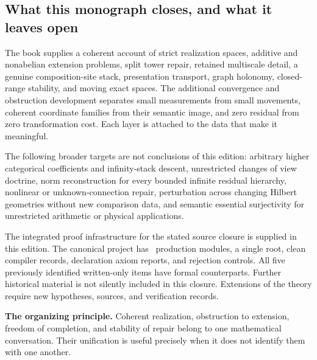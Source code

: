 \subsection{What this monograph closes, and what it leaves open}
The book supplies a coherent account of strict realization spaces, additive and nonabelian extension problems, split tower repair, retained multiscale detail, a genuine composition-site stack, presentation transport, graph holonomy, closed-range stability, and moving exact spaces. The additional convergence and obstruction development separates small measurements from small movements, coherent coordinate families from their semantic image, and zero residual from zero transformation cost. Each layer is attached to the data that make it meaningful.

The following broader targets are not conclusions of this edition: arbitrary higher categorical coefficients and infinity-stack descent, unrestricted changes of view doctrine, norm reconstruction for every bounded infinite residual hierarchy, nonlinear or unknown-connection repair, perturbation across changing Hilbert geometries without new comparison data, and semantic essential surjectivity for unrestricted arithmetic or physical applications.

The integrated proof infrastructure for the stated source closure is supplied in this edition. The canonical project has \EditionFormalModules\ production modules, a single root, clean compiler records, declaration axiom reports, and rejection controls. All five previously identified written-only items have formal counterparts. Further historical material is not silently included in this closure. Extensions of the theory require new hypotheses, sources, and verification records.

\begin{insight}
\textbf{The organizing principle.} Coherent realization, obstruction to extension, freedom of completion, and stability of repair belong to one mathematical conversation. Their unification is useful precisely when it does not identify them with one another.
\end{insight}

